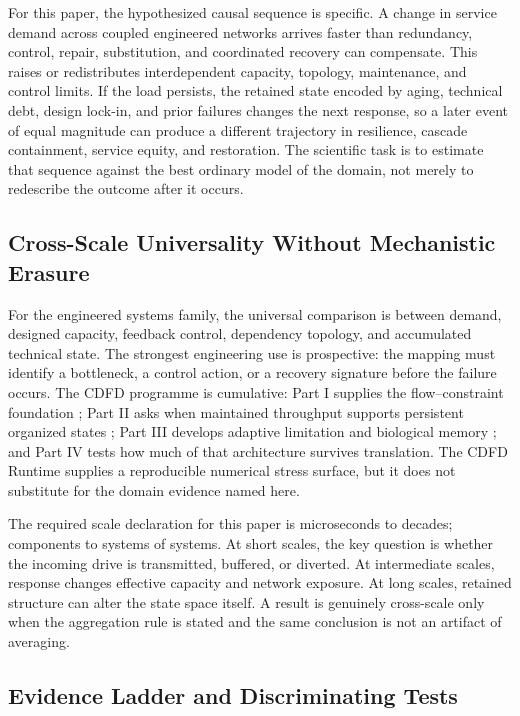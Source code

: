 \documentclass[12pt,a4paper]{article}
\begin{document}
For this paper, the hypothesized causal sequence is specific. A change in
service demand across coupled engineered networks arrives faster than redundancy, control, repair, substitution, and coordinated recovery can compensate.
This raises or redistributes interdependent capacity, topology, maintenance, and control limits. If the load persists,
the retained state encoded by aging, technical debt, design lock-in, and prior failures changes the next response, so a later event of equal
magnitude can produce a different trajectory in resilience, cascade containment, service equity, and restoration. The
scientific task is to estimate that sequence against the best ordinary model of
the domain, not merely to redescribe the outcome after it occurs.

\subsection{Cross-Scale Universality Without Mechanistic Erasure}

For the engineered systems family, the universal comparison is between demand, designed capacity, feedback control, dependency topology, and accumulated technical state. The strongest engineering use is prospective: the mapping must identify a bottleneck, a control action, or a recovery signature before the failure occurs. \cite{BarabasiAlbert1999,WattsStrogatz1998,Shannon1948,BakTangWiesenfeld1987}
The CDFD programme is cumulative: Part I supplies the flow--constraint
foundation \cite{MujjabiPartI2026}; Part II asks when maintained throughput
supports persistent organized states \cite{MujjabiPartII2026}; Part III
develops adaptive limitation and biological memory \cite{MujjabiPartIII2026};
and Part IV \cite{MujjabiPartIV2026} tests how much of that architecture
survives translation. The CDFD Runtime \cite{CDFDRuntime2026} supplies a
reproducible numerical stress surface, but it does not substitute for the
domain evidence named here.

The required scale declaration for this paper is microseconds to decades; components to systems of systems. At short
scales, the key question is whether the incoming drive is transmitted,
buffered, or diverted. At intermediate scales, response changes effective
capacity and network exposure. At long scales, retained structure can alter the
state space itself. A result is genuinely cross-scale only when the aggregation
rule is stated and the same conclusion is not an artifact of averaging.

\subsection{Evidence Ladder and Discriminating Tests}
\end{document}
